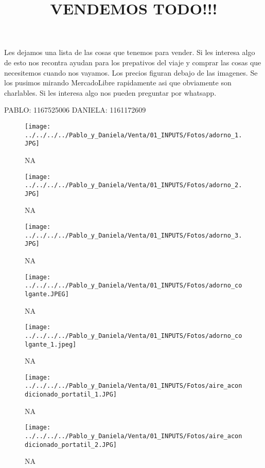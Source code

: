 \documentclass[
]{article}
\title{VENDEMOS TODO!!!}
\author{}
\date{}
\begin{document}
\maketitle

Les dejamos una lista de las cosas que tenemos para vender. Si les
interesa algo de esto nos recontra ayudan para los prepativos del viaje
y comprar las cosas que necesitemos cuando nos vayamos. Los precios
figuran debajo de las imagenes. Se los pusimos mirando MercadoLibre
rapidamente asi que obviamente son charlables. Si les interesa algo nos
pueden preguntar por whatsapp.

PABLO: 1167525006 DANIELA: 1161172609

\begin{figure}
\centering
\texttt{[image: ../../../../Pablo\_y\_Daniela/Venta/01\_INPUTS/Fotos/adorno\_1.JPG]}
\caption{NA}
\end{figure}

\pagebreak

\begin{figure}
\centering
\texttt{[image: ../../../../Pablo\_y\_Daniela/Venta/01\_INPUTS/Fotos/adorno\_2.JPG]}
\caption{NA}
\end{figure}

\pagebreak

\begin{figure}
\centering
\texttt{[image: ../../../../Pablo\_y\_Daniela/Venta/01\_INPUTS/Fotos/adorno\_3.JPG]}
\caption{NA}
\end{figure}

\pagebreak

\begin{figure}
\centering
\texttt{[image: ../../../../Pablo\_y\_Daniela/Venta/01\_INPUTS/Fotos/adorno\_colgante.JPEG]}
\caption{NA}
\end{figure}

\pagebreak

\begin{figure}
\centering
\texttt{[image: ../../../../Pablo\_y\_Daniela/Venta/01\_INPUTS/Fotos/adorno\_colgante\_1.jpeg]}
\caption{NA}
\end{figure}

\pagebreak

\begin{figure}
\centering
\texttt{[image: ../../../../Pablo\_y\_Daniela/Venta/01\_INPUTS/Fotos/aire\_acondicionado\_portatil\_1.JPG]}
\caption{NA}
\end{figure}

\pagebreak

\begin{figure}
\centering
\texttt{[image: ../../../../Pablo\_y\_Daniela/Venta/01\_INPUTS/Fotos/aire\_acondicionado\_portatil\_2.JPG]}
\caption{NA}
\end{figure}
\end{document}
